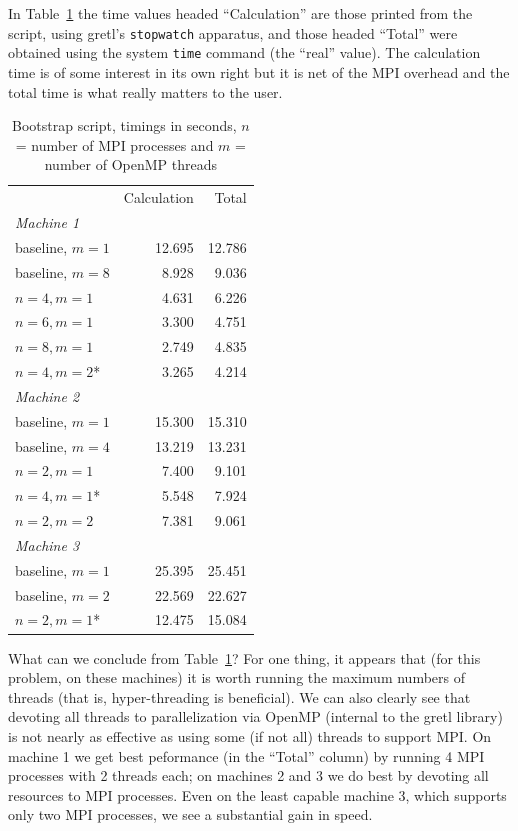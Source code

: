\documentclass{article}
\begin{document}
In Table~\ref{tab:boot-timings} the time values headed ``Calculation''
are those printed from the script, using gretl's \texttt{stopwatch}
apparatus, and those headed ``Total'' were obtained using the system
\texttt{time} command (the ``real'' value). The calculation time is of
some interest in its own right but it is net of the MPI overhead and
the total time is what really matters to the user.

\begin{table}[htbp]
\begin{center}
\begin{tabular}{lrr}
         & Calculation & Total \\
\textit{Machine 1} \\[2pt]
\quad baseline, $m=1$ & 12.695 & 12.786 \\
\quad baseline, $m=8$ & 8.928 & 9.036 \\
\quad $n=4,m=1$ & 4.631 & 6.226 \\
\quad $n=6,m=1$ & 3.300 & 4.751 \\
\quad $n=8,m=1$ & 2.749 & 4.835 \\
\quad $n=4,m=2$* & 3.265 & 4.214 \\[2pt]
\textit{Machine 2} \\[2pt]
\quad baseline, $m=1$ & 15.300 & 15.310 \\
\quad baseline, $m=4$ & 13.219 & 13.231 \\
\quad $n=2,m=1$ & 7.400 & 9.101 \\
\quad $n=4,m=1$* & 5.548 & 7.924 \\
\quad $n=2,m=2$ & 7.381 & 9.061 \\[2pt]
\textit{Machine 3} \\[2pt]
\quad baseline, $m=1$  & 25.395 & 25.451 \\
\quad baseline, $m=2$  & 22.569 & 22.627 \\
\quad $n=2,m=1$* & 12.475 & 15.084 \\
\end{tabular}
\end{center}
\caption{Bootstrap script, timings in seconds, $n$ = number of MPI
  processes and $m$ = number of OpenMP threads}
\label{tab:boot-timings}
\end{table}

What can we conclude from Table~\ref{tab:boot-timings}?  For one
thing, it appears that (for this problem, on these machines) it is
worth running the maximum numbers of threads (that is, hyper-threading
is beneficial). We can also clearly see that devoting all threads to
parallelization via \textsf{OpenMP} (internal to the gretl library) is
not nearly as effective as using some (if not all) threads to support
MPI. On machine 1 we get best peformance (in the ``Total'' column) by
running 4 MPI processes with 2 threads each; on machines 2 and 3 we do
best by devoting all resources to MPI processes. Even on the least
capable machine 3, which supports only two MPI processes, we see a
substantial gain in speed.
\end{document}
